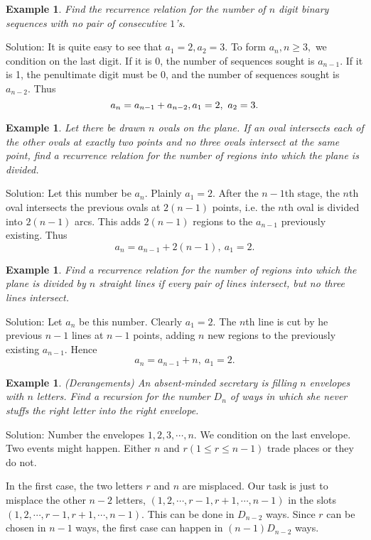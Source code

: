 \documentclass[11pt, openany]{book}
\theoremstyle{change} \theoremheaderfont{\blue\sffamily\bfseries}
\newtheorem{exa}[thm]{Example}
\theoremstyle{nonumberplain} \theoremheaderfont{\sffamily\bfseries}
\newcommand{\í}{\'{\i}}
\begin{document}
\begin{exa} Find the recurrence relation for the number of $n$ digit binary
sequences with no pair of consecutive $1$'s. \end{exa} Solution:
It is quite easy to see that $a_1 = 2, a_2 = 3.$ To form $a_n, n
\geq 3,$ we condition on the last digit. If it is 0, the number of
sequences sought is $a_{n - 1}$. If it is 1, the penultimate digit
must be 0, and the number of sequences sought is $a_{n - 2}$. Thus
$$ a_n = a_{n - 1} + a_{n - 2}, \vspace{5mm} a_1 = 2, \ a_2 = 3.$$
\begin{exa} Let there be drawn $n$ ovals on the plane. If an oval intersects
each of the other ovals at exactly two points and no three ovals
intersect at the same point, find a recurrence relation for the
number of regions into which the plane is divided. \end{exa}
Solution: Let this number be $a_n$. Plainly $a_1 = 2$.  After the
$n - 1$th stage, the $n$th oval intersects the previous ovals at
$2(n - 1)$ points, i.e. the $n$th oval is divided into $2(n - 1)$
arcs. This adds $2(n - 1)$ regions to the $a_{n - 1}$ previously
existing. Thus $$ a_n = a_{n - 1} + 2(n -1), \ a_1 = 2.$$
\begin{exa} Find a recurrence relation for the number of regions into which
the plane is divided by $n$ straight lines if every pair of lines
intersect, but no three lines intersect. \end{exa} Solution: Let
$a_n$ be this number. Clearly $a_1 = 2.$ The $n$th line is cut by
he previous $n - 1$ lines at $n - 1$ points, adding $n$ new
regions to the previously existing $a_{n -1}.$ Hence $$ a_n = a_{n
- 1} + n, \ a_1 = 2 .$$
\begin{exa} {\em (Derangements)} An absent-minded secretary is filling $n$
envelopes with $n$ letters. Find a recursion for the number $D_n$
of ways in which she never stuffs the right letter into the right
envelope.\end{exa} Solution: Number the envelopes $1, 2, 3, \cdots
, n$. We condition on the last envelope.  Two events might happen.
Either $n$ and $r (1 \leq r \leq n - 1)$ trade places or they do
not.



In the first case, the two letters $r$ and $n$ are misplaced. Our
task is just to misplace the other $n - 2$ letters, $(1, 2, \cdots
, r - 1, r + 1, \cdots , n - 1)$ in the slots $(1, 2, \cdots , r -
1, r + 1, \cdots , n - 1).$ This can be done in $D_{n - 2}$ ways.
Since $r$ can
be chosen in $n - 1$ ways, the first case can happen in $(n - 1)D_{n - 2}$ ways.\\
\end{document}
